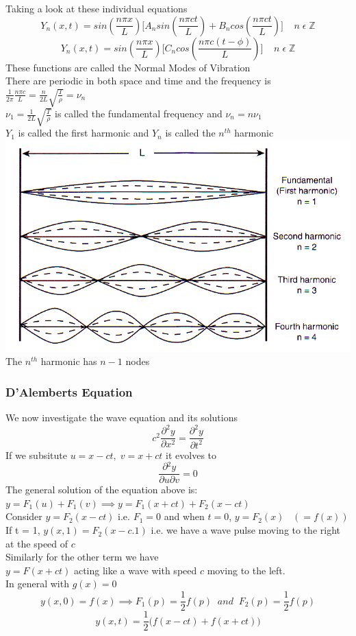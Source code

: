 \documentclass[11pt]{article}
\theoremstyle{definition}
\newcommand{\Z}{\mathbb{Z}}
\newcommand{\pd}{{\partial}}
\newcommand*{\pdo}[2]{\frac{\pd{#1}}{\pd{#2}}}%
\newcommand*{\pdt}[2]{\frac{\pd^2{#1}}{\pd{#2}^2}}
\begin{document}
Taking a look at these individual equations
$$Y_n(x,t) = sin(\frac{n\pi x}{L}) \Big[A_n sin(\frac{n\pi c t}{L}) + B_n cos(\frac{n\pi c t}{L})\Big] \;\;\;\; n\; \epsilon\; \Z$$
$$Y_n(x,t) = sin(\frac{n\pi x}{L}) \Big[C_n cos(\frac{n\pi c (t-\phi)}{L})\Big] \;\;\;\; n\; \epsilon\; \Z$$
These functions are called the Normal Modes of Vibration\\ There are periodic in both space and time and the frequency is $\frac{1}{2\pi}\frac{n\pi c }{L} = \frac{n}{2L}\sqrt{\frac{T}{\rho}} = \nu_n$\\
$\nu_1 = \frac{1}{2L} \sqrt{\frac{T}{\rho}}$ is called the fundamental frequency and
$\nu_n = n \nu_1$\\
$Y_1$ is called the first harmonic and $Y_n$ is called the $n^{th}$ harmonic\\
\includegraphics[]{harmonics.png}\\
The $n^{th}$ harmonic has $n-1$ nodes\\
\subsubsection{D'Alemberts Equation}
We now investigate the wave equation and its solutions
$$ c^2\pdt{y}{x} = \pdt{y}{t}$$
If we subsitute $u = x-ct,\; v = x + ct$ it evolves to
$$\pdo{^2y}{u\partial v} = 0$$
The general solution of the equation above is:
$y = F_1(u) + F_1(v) \implies y = F_1(x+ct) + F_2(x-ct)$\\
Consider $y = F_2(x-ct)$ i.e. $F_1 = 0$ and when $t = 0$, $y = F_2(x) \;\;\; (=f(x))$\\
If t = 1,
$y(x,1) = F_2(x - c.1)$ i.e. we have a wave pulse moving to the right at the speed of $c$\\
Similarly for the other term we have\\
$y = F(x+ct)$ acting like a wave with speed $c$ moving to the left.\\
In general with $g(x) = 0$
$$y(x,0) = f(x) \implies F_1(p) = \frac{1}{2}f(p)\;\; and \;\; F_2(p) = \frac{1}{2}f(p)$$
$$y(x,t) = \frac{1}{2}\Big(f(x-ct) + f(x+ct)\Big)$$
\end{document}
